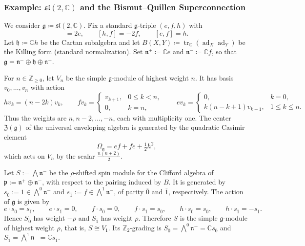 \documentclass[11pt]{amsart}
\newcommand{\tr}{\operatorname{tr}}
\newcommand{\ad}{\operatorname{ad}}
\def\CC{{\mathbb C}}
\def\hh{{\mathfrak h}}
\def\nn {{\mathfrak{n}}}
\def\gg{{\mathfrak{g}}}
\def\ZZ{{\mathbb Z}}
\theoremstyle{plain}
\theoremstyle{remark}
\theoremstyle{definition}
\numberwithin{equation}{section}
\theoremstyle{remark}
\begin{document}
\subsubsection{Example: \texorpdfstring{$\mathfrak{sl}(2,\CC)$}{sl(2,C)} and the Bismut--Quillen Superconnection}\label{subsec::an_example}
 We consider $\gg\coloneqq \mathfrak{sl}(2,\CC)$. Fix a standard $\gg$-triple $(e,f,h)$ with
\begin{equation}
 [h,e]=2e,\qquad [h,f]=-2f,\qquad [e,f]=h.
\end{equation}
Let $\hh\coloneqq \CC h$ be the Cartan subalgebra and let $B(X,Y)\coloneqq \tr_{\CC}(\ad_X\ad_Y)$ be the Killing form (standard normalization). Set
$\nn^{+}\coloneqq \CC e$ and $\nn^{-}\coloneqq \CC f$, so that $\gg=\nn^{-}\oplus\hh\oplus\nn^{+}$.

For $n\in\ZZ_{\ge 0}$, let $V_n$ be the simple $\gg$-module of highest weight $n$. It has basis
$v_0,\dots,v_n$ with action
\[
 h v_k=(n-2k)v_k,\qquad
 f v_k=\begin{cases} v_{k+1}, & 0\le k<n,\\ 0, & k=n,\end{cases}
 \qquad
 e v_k=\begin{cases} 0, & k=0,\\ k(n-k+1)v_{k-1}, & 1\le k\le n.\end{cases}
\]
Thus the weights are $n,n-2,\dots,-n$, each with multiplicity one. The center $\mathfrak{Z}(\gg)$ of the universal enveloping algebra is generated by the quadratic Casimir element
\begin{equation}
 \Omega_{\gg}=ef+fe+\tfrac12 h^{2},
\end{equation}
which acts on $V_n$ by the scalar $\tfrac{n(n+2)}{2}$.

Let $S:=\bigwedge \mathfrak n^{-}$ be the $\rho$-shifted spin module for the Clifford algebra of $\mathfrak p:=\mathfrak n^{+}\oplus \mathfrak n^{-}$, with respect to the pairing induced by $B$. It is generated by $s_{\bar 0}:=1\in \bigwedge^{0}\mathfrak n^{-}$ and $s_{\bar 1}:=f\in \bigwedge^{1}\mathfrak n^{-}$, of parity $\bar 0$ and $\bar 1$, respectively. The action of $\mathfrak g$ is given by
\begin{equation*}
e\cdot s_{\bar 0}=s_{\bar 1}, \qquad e\cdot s_{\bar 1}=0, \qquad f\cdot s_{\bar 0}=0, \qquad f\cdot s_{\bar 1}=s_{\bar 0}, \qquad h\cdot s_{\bar 0}=s_{\bar 0}, \qquad h\cdot s_{\bar 1}=-s_{\bar 1}.
\end{equation*}
Hence $S_{\bar 0}$ has weight $-\rho$ and $S_{\bar 1}$ has weight $\rho$. Therefore $S$ is the simple $\mathfrak g$-module of highest weight $\rho$, that is, $S\cong V_{1}$. Its $\ZZ_{2}$-grading is $S_{\bar 0}=\bigwedge^{0}\mathfrak n^{-}=\CC s_{\bar 0}$ and $S_{\bar 1}=\bigwedge^{1}\mathfrak n^{-}=\CC s_{\bar 1}$.
\end{document}
